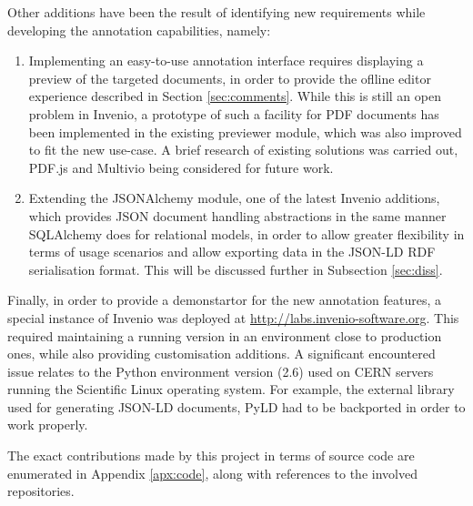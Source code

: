Other additions have been the result of identifying new requirements while
developing the annotation capabilities, namely:
\begin{enumerate}
  \item Implementing an easy-to-use annotation interface requires displaying a
        preview of the targeted documents, in order to provide the oflline
        editor experience described in Section \ref{sec:comments}. While this
        is still an open problem in Invenio, a prototype of such a facility for
        PDF documents has been implemented in the existing previewer module,
        which was also improved to fit the new use-case. A brief research of
        existing solutions was carried out, PDF.js \cite{ref:pdfjs} and Multivio
        \cite{ref:multivio} being considered for future work.
  \item Extending the JSONAlchemy module, one of the latest Invenio additions,
        which provides JSON document handling abstractions in the same manner
        SQLAlchemy does for relational models, in order to allow greater
        flexibility in terms of usage scenarios and allow exporting data in
        the JSON-LD RDF serialisation format. This will be discussed further in
        Subsection \ref{sec:diss}.
\end{enumerate}

Finally, in order to provide a demonstartor for the new annotation features, a special
instance of Invenio was deployed at \url{http://labs.invenio-software.org}.
This required maintaining a running version in an environment close to
production ones, while also providing customisation additions. A significant
encountered issue relates to the Python environment version (2.6) used on CERN
servers running the Scientific Linux operating system. For example, the
external library used for generating JSON-LD documents, PyLD \cite{ref:pyld}
had to be backported in order to work properly.

The exact contributions made by this project in terms of source code are
enumerated in Appendix \ref{apx:code}, along with references to the involved
repositories.
